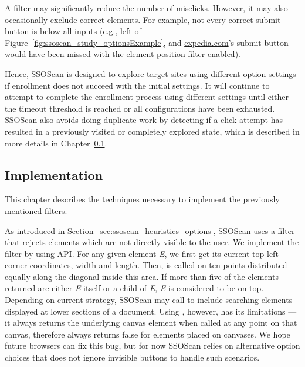 A filter may significantly reduce the number of mis\-clicks.  However, it may also occasionally exclude correct elements.  For example, not every correct submit button is below all inputs (e.g., left of Figure~\ref{fig:ssoscan_study_optionsExample}, and \url{expedia.com}'s submit button would have been missed with the element position filter enabled).  

Hence, SSOScan is designed to explore target sites using different option settings if enrollment does not succeed with the initial settings.  It will continue to attempt to complete the enrollment process using different settings until either the timeout threshold is reached or all configurations have been exhausted.  SSOScan also avoids doing duplicate work by detecting if a click attempt has resulted in a previously visited or completely explored state, which is described in more details in Chapter~\ref{sec:ssoscan_heuristics_impl}.

\subsection{Implementation}
\label{sec:ssoscan_heuristics_impl}

This chapter describes the techniques necessary to implement the previously mentioned filters.  

 As introduced in Section~\ref{sec:ssoscan_heuristics_options}, SSOScan uses a filter that rejects elements which are not directly visible to the user.  We implement the filter by using  API.  For any given element \emph{E}, we first get its current top-left corner coordinates, width and length.  Then,  is called on ten points distributed equally along the diagonal inside this area.  If more than five of the elements returned are either \emph{E} itself or a child of \emph{E}, \emph{E} is considered to be on top.  Depending on current strategy, SSOScan may call  to include searching elements displayed at lower sections of a document.  Using , however, has its limitations --- it always returns the underlying canvas element when called at any point on that canvas, therefore  always returns false for elements placed on canvases.  We hope future browsers can fix this bug, but for now SSOScan relies on alternative option choices that does not ignore invisible buttons to handle such scenarios.

